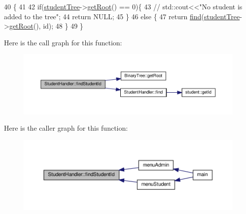 \begin{DoxyCode}
40                                              \{
41 
42     \textcolor{keywordflow}{if}(\hyperlink{class_student_handler_a7141eccd57a30aa140e5b4e92b0939ea}{studentTree}->\hyperlink{class_binary_tree_a9ee0cf09781cf2ecc471aacc61848dde}{getRoot}() == 0)\{
43 \textcolor{comment}{//      std::cout<<"No student is added to the tree";}
44         \textcolor{keywordflow}{return} NULL;
45     \}
46     \textcolor{keywordflow}{else} \{
47         \textcolor{keywordflow}{return} \hyperlink{class_student_handler_a366b1628971d8b8ae437a87978e26e8a}{find}(\hyperlink{class_student_handler_a7141eccd57a30aa140e5b4e92b0939ea}{studentTree}->\hyperlink{class_binary_tree_a9ee0cf09781cf2ecc471aacc61848dde}{getRoot}(), id);
48     \}
49 \}
\end{DoxyCode}
Here is the call graph for this function\+:
\nopagebreak
\begin{figure}[H]
\begin{center}
\leavevmode
\includegraphics[width=350pt]{class_student_handler_ad54072af22b0b84e677af69426ed0bff_cgraph}
\end{center}
\end{figure}
Here is the caller graph for this function\+:
\nopagebreak
\begin{figure}[H]
\begin{center}
\leavevmode
\includegraphics[width=350pt]{class_student_handler_ad54072af22b0b84e677af69426ed0bff_icgraph}
\end{center}
\end{figure}
\mbox{\label{class_student_handler_a9caee269c1ef9b34af2eeb0452a0cabb}} 

